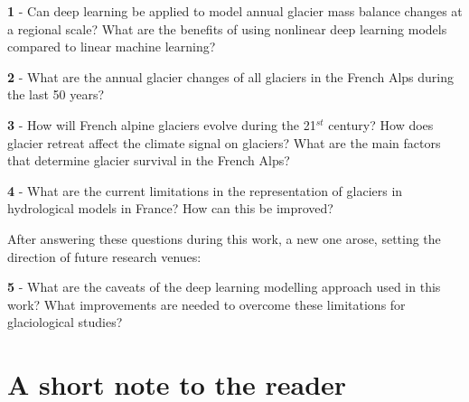 \begin{list}{\textbf{Question}}{}

\item \textbf{1} - Can deep learning be applied to model annual glacier mass balance changes at a regional scale? What are the benefits of using nonlinear deep learning models compared to linear machine learning?

\item \textbf{2}  - What are the annual glacier changes of all glaciers in the French Alps during the last 50 years? 

\item \textbf{3} - How will French alpine glaciers evolve during the 21$^{st}$ century? How does glacier retreat affect the climate signal on glaciers? What are the main factors that determine glacier survival in the French Alps?

\item \textbf{4} - What are the current limitations in the representation of glaciers in hydrological models in France? How can this be improved?

\end{list}

After answering these questions during this work, a new one arose, setting the direction of future research venues:

\begin{list}{\textbf{Question}}{}

\item \textbf{5} - What are the caveats of the deep learning modelling approach used in this work? What improvements are needed to overcome these limitations for glaciological studies?

\end{list}

\section*{A short note to the reader}

